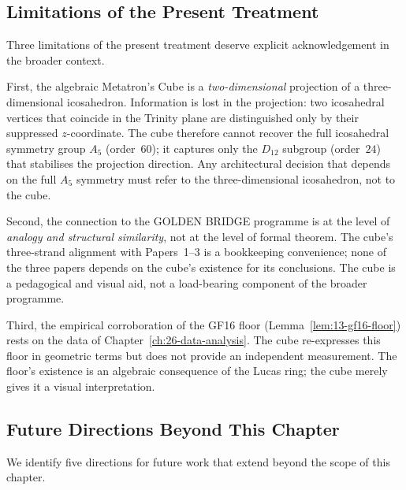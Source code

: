 \subsection{Limitations of the Present Treatment}
\label{fa_13:sec:13-limitations-broader}

Three limitations of the present treatment deserve explicit
acknowledgement in the broader context.

First, the algebraic Metatron's Cube is a \emph{two-dimensional}
projection of a three-dimensional icosahedron. Information is lost in
the projection: two icosahedral vertices that coincide in the Trinity
plane are distinguished only by their suppressed $z$-coordinate. The
cube therefore cannot recover the full icosahedral symmetry group
$A_5$ (order~$60$); it captures only the $D_{12}$ subgroup
(order~$24$) that stabilises the projection direction. Any
architectural decision that depends on the full $A_5$ symmetry must
refer to the three-dimensional icosahedron, not to the cube.

Second, the connection to the GOLDEN BRIDGE programme is at the level
of \emph{analogy and structural similarity}, not at the level of
formal theorem. The cube's three-strand alignment with Papers~1--3 is
a bookkeeping convenience; none of the three papers depends on the
cube's existence for its conclusions. The cube is a pedagogical and
visual aid, not a load-bearing component of the broader programme.

Third, the empirical corroboration of the GF16 floor
(Lemma~\ref{lem:13-gf16-floor}) rests on the data of
Chapter~\ref{ch:26-data-analysis}. The cube re-expresses this floor
in geometric terms but does not provide an independent measurement.
The floor's existence is an algebraic consequence of the Lucas ring;
the cube merely gives it a visual interpretation.

\subsection{Future Directions Beyond This Chapter}
\label{fa_13:sec:13-future-beyond}

We identify five directions for future work that extend beyond the
scope of this chapter.

